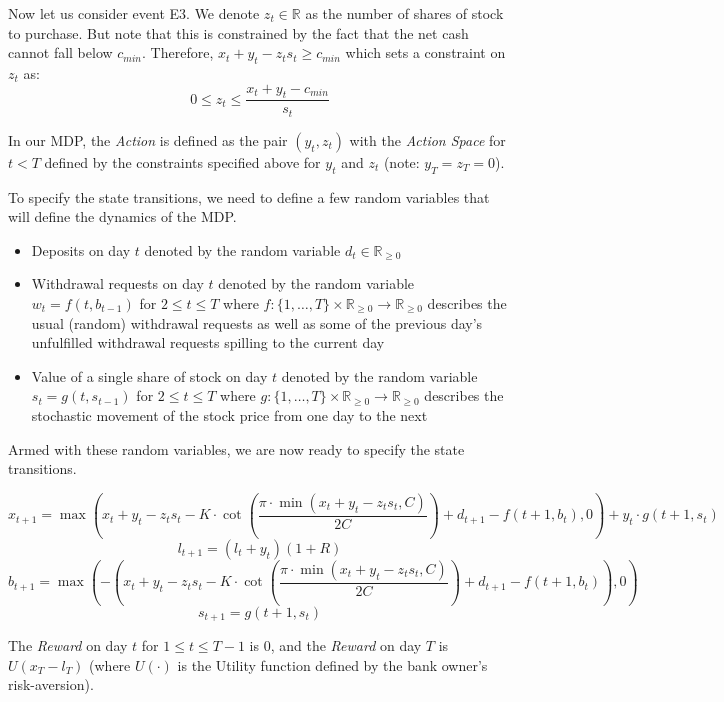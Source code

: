 \documentclass[12pt]{exam}
\begin{document}
\begin{questions}
Now let us consider event E3. We denote $z_t\in \mathbb{R}$ as the number of shares of stock to purchase. But note that this is constrained by the fact that the net cash cannot fall below $c_{min}$. Therefore, $x_t + y_t - z_ts_t \geq c_{min}$ which sets a constraint on $z_t$ as:
$$0 \leq z_t \leq \frac {x_t + y_t - c_{min}} {s_t}$$
 
In our MDP, the {\em Action} is defined as the pair $(y_t,z_t)$ with the {\em Action Space} for $t < T$ defined by the constraints specified above for $y_t$ and $z_t$ (note: $y_T = z_T = 0$).

To specify the state transitions, we need to define a few random variables that will define the dynamics of the MDP.
\begin{itemize}
\item Deposits on day $t$ denoted by the random variable $d_t \in \mathbb{R}_{\geq 0}$
\item Withdrawal requests on day $t$ denoted by the random variable $w_t = f(t, b_{t-1})$ for $2 \leq t \leq T$ where $f: \{1, \ldots, T\} \times \mathbb{R}_{\geq 0} \rightarrow \mathbb{R}_{\geq 0}$ describes the usual (random) withdrawal requests as well as some of the previous day's unfulfilled withdrawal requests spilling to the current day
\item Value of a single share of stock on day $t$ denoted by the random variable $s_t = g(t, s_{t-1})$ for $2\leq t \leq T$ where $g: \{1, \ldots, T\} \times \mathbb{R}_{\geq 0} \rightarrow \mathbb{R}_{\geq 0}$ describes the stochastic movement of the stock price from one day to the next
\end{itemize}

Armed with these random variables, we are now ready to specify the state transitions.

$$x_{t+1} = \max(x_t + y_t - z_ts_t - K \cdot \cot(\frac {\pi \cdot \min(x_t + y_t - z_ts_t, C)} {2C})   + d_{t+1} - f(t+1, b_t), 0) + y_t \cdot g(t+1, s_t)$$
$$l_{t+1} = (l_t + y_t)(1+R)$$
$$b_{t+1} = \max(-(x_t + y_t - z_ts_t - K \cdot \cot(\frac {\pi \cdot \min(x_t + y_t - z_ts_t, C)} {2C})   + d_{t+1} - f(t+1,b_t)), 0)$$
$$s_{t+1} = g(t+1, s_t)$$


The {\em Reward} on day $t$ for $1\leq t \leq T-1$ is 0, and the {\em Reward} on day $T$ is $U(x_T - l_T)$ (where $U(\cdot)$ is the Utility function defined by the bank owner's risk-aversion). 



\end{questions}
\end{document}
